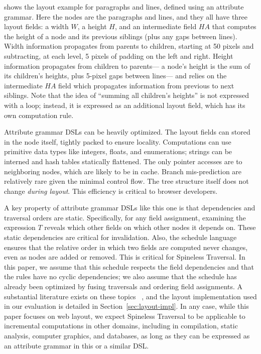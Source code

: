  shows
  the layout example for paragraphs and lines,
  defined using an attribute grammar.
Here the nodes are the paragraphs and lines,
  and they all have three layout fields:
  a width $W$, a height $H$, and an intermediate field $HA$
  that computes the height of a node and its previous siblings
  (plus any gaps between lines).
Width information propagates from parents to children,
  starting at 50 pixels and subtracting, at each level,
  5 pixels of padding on the left and right.
Height information propagates from children to parents---%
  a node's height is the sum of its children's heights,
  plus 5-pixel gaps between lines---%
  and relies on the intermediate $HA$ field
  which propagates information from previous to next siblings.
Note that the idea of ``summing all children's heights''
  is not expressed with a loop;
  instead, it is expressed as an additional layout field,
  which has its own computation rule.

Attribute grammar DSLs can be heavily optimized.
The layout fields can stored in the node itself,
  tightly packed to ensure locality.
Computations can use primitive data types
  like integers, floats, and enumerations;
  strings can be interned and hash tables statically flattened.
The only pointer accesses are to neighboring nodes,
  which are likely to be in cache.
Branch mis-prediction are relatively rare
  given the minimal control flow.
The tree structure itself does not change \emph{during layout}.
This efficiency is critical to browser developers.

A key property of attribute grammar DSLs like this one
  is that dependencies and traversal orders are static.
Specifically, for any field assignment,
  examining the expression $T$ reveals
  which other fields on which other nodes it depends on.
These static dependencies are critical for invalidation.
Also, the schedule language ensures that
  the relative order in which two fields are computed
  never changes, even as nodes are added or removed.
This is critical for Spineless Traversal.
In this paper, we assume that this schedule
  respects the field dependencies
  and that the rules have no cyclic dependencies;
  we also assume that the schedule has already been optimized
  by fusing traversals and ordering field assignments.
A substantial literature exists on these topics~%
  \cite{grafter,yufeng-1,yufeng-2},
  and the layout implementation used in our evaluation
  is detailed in Section~\ref{sec:layout-impl}.
In any case, while this paper focuses on web layout,
  we expect Spineless Traversal to be applicable
  to incremental computations in other domains,
  including in compilation, static analysis,
  computer graphics, and databases,
  as long as they can be expressed as an attribute grammar
  in this or a similar DSL.